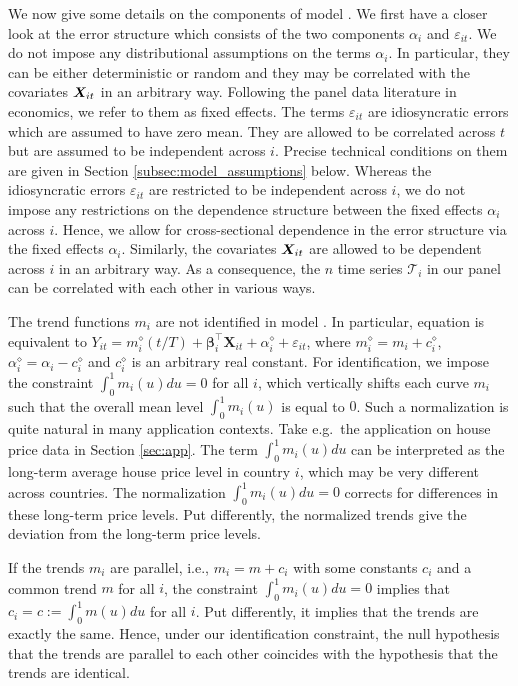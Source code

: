 \documentclass[12pt]{article}
\makeatletter
\renewcommand{\eqref}[1]{\tagform@{\ref{#1}}}
\makeatother
\begin{document}
We now give some details on the components of model \eqref{eq:model_full}. We first have a closer look at the error structure which consists of the two components $\alpha_i$ and $\varepsilon_{it}$. We do not impose any distributional assumptions on the terms $\alpha_i$. In particular, they can be either deterministic or random and they may be correlated with the covariates $\boldsymbol{X}_{it}$ in an arbitrary way. Following the panel data literature in economics, we refer to them as fixed effects. The terms $\varepsilon_{it}$ are idiosyncratic errors which are assumed to have zero mean. They are allowed to be correlated across $t$ but are assumed to be independent across $i$. Precise technical conditions on them are given in Section \ref{subsec:model_assumptions} below.  Whereas the idiosyncratic errors $\varepsilon_{it}$ are restricted to be independent across $i$, we do not impose any restrictions on the dependence structure between the fixed effects $\alpha_i$ across $i$. Hence, we allow for cross-sectional dependence in the error structure via the fixed effects $\alpha_i$. Similarly, the covariates $\boldsymbol{X}_{it}$ are allowed to be dependent across $i$ in an arbitrary way. As a consequence, the $n$ time series $\mathcal{T}_i$ in our panel can be correlated with each other in various ways.  


The trend functions $m_i$ are not identified in model \eqref{eq:model_full}. In particular, equation \eqref{eq:model_full} is equivalent to $Y_{it} = m_i^\diamond(t/T) + \boldsymbol{\beta}_i^\top \boldsymbol{X}_{it} + \alpha_i^\diamond + \varepsilon_{it}$, where $m_i^\diamond = m_i + c_i^\diamond$, $\alpha_i^\diamond = \alpha_i - c_i^\diamond$ and $c_i^\diamond$ is an arbitrary real constant. 
For identification, we impose the constraint $\int_0^1 m_i(u) du = 0$ for all $i$, which vertically shifts each curve $m_i$ such that the overall mean level $\int_0^1 m_i(u)$ is equal to $0$. Such a normalization is quite natural in many application contexts. Take e.g.\ the application on house price data in Section \ref{sec:app}. The term $\int_0^1 m_i(u) du$ can be interpreted as the long-term average house price level in country $i$, which may be very different across countries. The normalization $\int_0^1 m_i(u) du = 0$ corrects for differences in these long-term price levels. Put differently, the normalized trends give the deviation from the long-term price levels. 


If the trends $m_i$ are parallel, i.e., $m_i = m + c_i$ with some constants $c_i$ and a common trend $m$ for all $i$, the constraint $\int_0^1 m_i(u) du = 0$ implies that $c_i = c := \int_0^1 m(u) du$ for all $i$. Put differently, it implies that the trends are exactly the same. Hence, under our identification constraint, the null hypothesis that the trends are parallel to each other coincides with the hypothesis that the trends are identical. 
\end{document}
